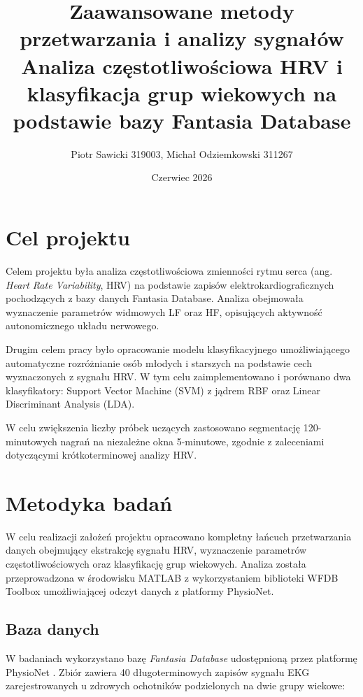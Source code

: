 \documentclass[a4paper,12pt]{article}
\title{
\Large Zaawansowane metody przetwarzania i analizy sygnałów \\[6pt]
\textbf{Analiza częstotliwościowa HRV i klasyfikacja grup wiekowych na podstawie bazy Fantasia Database}
}
\author{Piotr Sawicki 319003, Michał Odziemkowski 311267}
\date{Czerwiec 2026}
\begin{document}
\maketitle

\tableofcontents


\newpage
\section{Cel projektu}

Celem projektu była analiza częstotliwościowa zmienności rytmu serca (ang. \textit{Heart Rate Variability}, HRV) na podstawie zapisów elektrokardiograficznych pochodzących z bazy danych Fantasia Database. Analiza obejmowała wyznaczenie parametrów widmowych LF oraz HF, opisujących aktywność autonomicznego układu nerwowego.

Drugim celem pracy było opracowanie modelu klasyfikacyjnego umożliwiającego automatyczne rozróżnianie osób młodych i starszych na podstawie cech wyznaczonych z sygnału HRV. W tym celu zaimplementowano i porównano dwa klasyfikatory: Support Vector Machine (SVM) z jądrem RBF oraz Linear Discriminant Analysis (LDA).

W celu zwiększenia liczby próbek uczących zastosowano segmentację 120-minutowych nagrań na niezależne okna 5-minutowe, zgodnie z zaleceniami dotyczącymi krótkoterminowej analizy HRV.


\section{Metodyka badań}

W celu realizacji założeń projektu opracowano kompletny łańcuch przetwarzania danych obejmujący ekstrakcję sygnału HRV, wyznaczenie parametrów częstotliwościowych oraz klasyfikację grup wiekowych. Analiza została przeprowadzona w środowisku MATLAB z wykorzystaniem biblioteki WFDB Toolbox umożliwiającej odczyt danych z platformy PhysioNet.

\subsection{Baza danych}

W badaniach wykorzystano bazę \textit{Fantasia Database} udostępnioną przez platformę PhysioNet \cite{fantasia,physionet}. Zbiór zawiera 40 długoterminowych zapisów sygnału EKG zarejestrowanych u zdrowych ochotników podzielonych na dwie grupy wiekowe:
\end{document}
